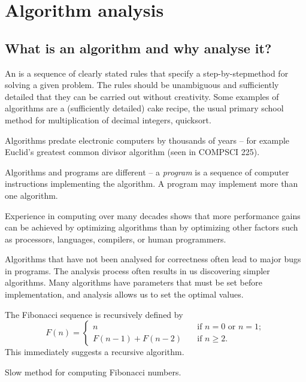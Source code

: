 \part{Algorithm analysis} \label{ch:alganal}

\chapter{What is an algorithm and why analyse it?} %
An  is a sequence of clearly stated rules that
specify a step-by-step\linebreak[4] method for solving a given problem.
The rules should be unambiguous and sufficiently detailed that they can be carried out without creativity.
Some examples of algorithms are a (sufficiently detailed) cake recipe,
the usual primary school method for multiplication of decimal integers, quicksort.

Algorithms predate electronic computers by thousands of years -- for example
Euclid's greatest common divisor algorithm (seen in COMPSCI 225).

Algorithms and programs are different -- a \emph{program} is a sequence of computer instructions implementing 
the algorithm. A program may implement more than one algorithm.

Experience in computing over many decades shows that more performance gains can be achieved 
by optimizing algorithms than by optimizing other factors such as
processors, languages, compilers, or human programmers.

Algorithms that have not been analysed for correctness often lead to 
major bugs in programs. The analysis process often results in us discovering simpler algorithms.
Many algorithms have parameters that must be set before implementation, and analysis allows us to set the optimal values.


\begin{Boxample}
The Fibonacci sequence is recursively defined by 
$$
F(n) = 
  \left\{\begin{array}{ll}
	n & \quad \text{if } n = 0 \text{ or } n = 1; \\ 
    F(n - 1) + F(n - 2) & \quad \text{if } n \geq 2 \text{.}
  \end{array}
  \right.
$$
This immediately suggests a recursive algorithm.
\end{Boxample}

\begin{algorithm}[H]
  \caption{Slow method for computing Fibonacci numbers.} 
  \label{alg:slowfib}
\begin{algorithmic}[1]
	\EndIf
\EndFunction
\end{algorithmic}
\end{algorithm}

